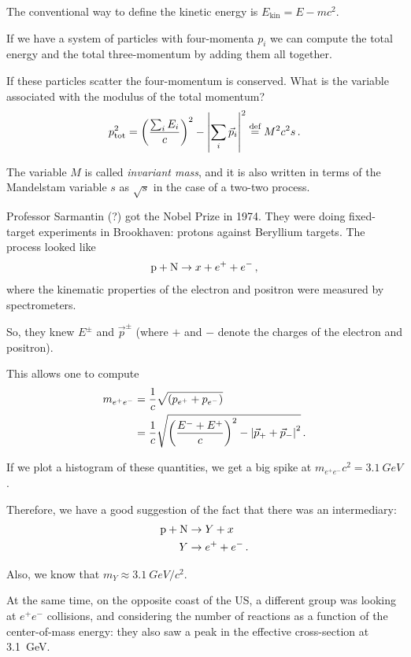 \documentclass[main.tex]{subfiles}
\begin{document}
The conventional way to define the kinetic energy is \(E _{\text{kin}} = E - mc^2\). 

If we have a system of particles with four-momenta \(p_i\) we can compute the total energy and the total three-momentum by adding them all together. 

If these particles scatter the four-momentum is conserved. 
What is the variable associated with the modulus of the total momentum? 
%
\begin{align}
p _{\text{tot}}^2 = \qty(\frac{\sum _{i} E_i}{c})^2 - \abs{\sum _i \vec{p}_i}^2 \overset{\text{def}}{=} M^2 c^2s
\,.
\end{align}

The variable \(M\) is called \emph{invariant mass}, and it is also written in terms of the Mandelstam variable \(s\) as \(\sqrt{s}\) in the case of a two-two process.

Professor Sarmantin (?) got the Nobel Prize in 1974. 
They were doing fixed-target experiments in Brookhaven: protons against Beryllium targets. 
The process looked like 
%
\begin{align}
\ce{p} + \ce{N} \to x + e^{+} + e^{-}
\,,
\end{align}
%
where the kinematic properties of the electron and positron were measured by spectrometers. 

So, they knew \(E^{\pm}\) and \(\vec{p}^{\pm}\) (where \(+\) and \(-\) denote the charges of the electron and positron). 

This allows one to compute 
%
\begin{align}
m_{e^{+} e^{-}} &= \frac{1}{c} \sqrt{(p_{e^{+}} + p_{e^{-}})}   \\
&= \frac{1}{c} \sqrt{\qty(\frac{E^{-} + E^{+}}{c})^2
- \abs{\vec{p}_+ + \vec{p}_-}^2} 
\,.
\end{align}

If we plot a histogram of these quantities, we get a big spike at \(m_{e^{+}e^{-}}c^2 = \SI{3.1}{GeV}\).

Therefore, we have a good suggestion of the fact that there was an intermediary: 
%
\begin{align}
\ce{p} + \ce{N} &\to Y +x  \\
Y  &\to e^{+} + e^{-}
\,.
\end{align}

Also, we know that \(m_Y \approx \SI{3.1}{GeV} / c^2\). 

At the same time, on the opposite coast of the US, a different group was looking at \(e^{+}e^{-}\) collisions, and considering the number of reactions as a function of the center-of-mass energy: they also saw a peak in the effective cross-section at \SI{3.1}{GeV}. 
\end{document}
